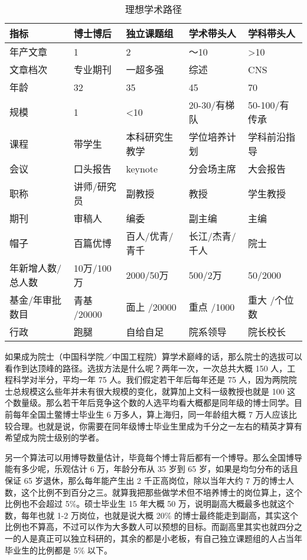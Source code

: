 \documentclass[]{tufte-book}
\begin{document}
\begin{longtable}[t]{lllll}
\caption{\label{tab:unnamed-chunk-1}理想学术路径}\\
\toprule
指标 & 博士博后 & 独立课题组 & 学术带头人 & 学科带头人\\
\midrule
年产文章 & 1 & 2 & ～10 & >10\\
文章档次 & 专业期刊 & 一超多强 & 综述 & CNS\\
年龄 & 32 & 35 & 45 & 70\\
规模 & 1 & <10 & 20-30/有梯队 & 50-100/有传承\\
课程 & 带学生 & 本科研究生教学 & 学位培养计划 & 学科前沿指导\\
\addlinespace
会议 & 口头报告 & keynote & 分会场主席 & 大会报告\\
职称 & 讲师/研究员 & 副教授 & 教授 & 学生教授\\
期刊 & 审稿人 & 编委 & 副主编 & 主编\\
帽子 & 百篇优博 & 百人/优青/青千 & 长江/杰青/千人 & 院士\\
年新增人数/总人数 & 10万/100万 & 2000/50万 & 500/2万 & 50/2000\\
\addlinespace
基金/年审批数目 & 青基 /20000 & 面上 /20000 & 重点 /1000 & 重大 /个位数\\
行政 & 跑腿 & 自给自足 & 院系领导 & 院长校长\\
\bottomrule
\end{longtable}

如果成为院士（中国科学院／中国工程院）算学术巅峰的话，那么院士的选拔可以看作到达顶峰的路径。选拔方法是什么呢？两年一次，一次总共大概 150 人，工程科学对半分，平均一年 75 人。我们假定若干年后每年还是 75 人，因为两院院士总规模这么些年并未有很大规模的变化，就算加上文科一级教授也就是 100 这个数量级。那么若干年后竞争这个数的人选平均看大概都是同年级的博士同学。目前每年全国土鳖博士毕业生 6 万多人，算上海归，同一年龄组大概 7 万人应该比较合理。也就是说，你需要在同年级博士毕业生里成为千分之一左右的精英才算有希望成为院士级别的学者。

另一个算法可以用博导数量估计，毕竟每个博士背后都有一个博导。那么全国博导能有多少呢，乐观估计 6 万，年龄分布从 35 岁到 65 岁，如果是均匀分布的话且保证 65 岁退休，那么每年能产生出 2 千正高岗位，除以当年大约 7 万的博士人数，这个比例不到百分之三。就算我把那些做学术但不培养博士的岗位算上，这个比例也不会超过 5\%。硕士毕业生 15 年大概 50 万，说明副高大概最多也就这个数，每年也就 1-2 万岗位，也就是说大概 20\% 的博士最终能走到副高，其实这个比例也不算高，不过可以作为大多数人可以预想的目标。而副高里其实也就四分之一的人是真正可以独立科研的，其余的都是小老板，有自己独立课题组的人占当年毕业生的比例都是 5\% 以下。
\end{document}
